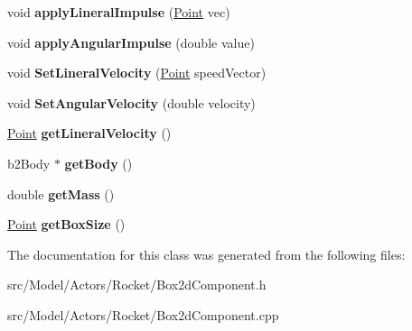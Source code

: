 \begin{DoxyCompactItemize}
\item 
void {\bfseries apply\+Lineral\+Impulse} (\hyperlink{classPoint}{Point} vec)\hypertarget{classBox2dComponent_a222c329dd4b78ba416b37e23046cc729}{}\label{classBox2dComponent_a222c329dd4b78ba416b37e23046cc729}

\item 
void {\bfseries apply\+Angular\+Impulse} (double value)\hypertarget{classBox2dComponent_aa1be5c7330ce571911b2a642aebeff7b}{}\label{classBox2dComponent_aa1be5c7330ce571911b2a642aebeff7b}

\item 
void {\bfseries Set\+Lineral\+Velocity} (\hyperlink{classPoint}{Point} speed\+Vector)\hypertarget{classBox2dComponent_a853f5c32d29169a4ec13c1d92ed9eb02}{}\label{classBox2dComponent_a853f5c32d29169a4ec13c1d92ed9eb02}

\item 
void {\bfseries Set\+Angular\+Velocity} (double velocity)\hypertarget{classBox2dComponent_a7093fe0c26442b394c487c892d601891}{}\label{classBox2dComponent_a7093fe0c26442b394c487c892d601891}

\item 
\hyperlink{classPoint}{Point} {\bfseries get\+Lineral\+Velocity} ()\hypertarget{classBox2dComponent_a6d2848cfe0e699038274c549993def47}{}\label{classBox2dComponent_a6d2848cfe0e699038274c549993def47}

\item 
b2\+Body $\ast$ {\bfseries get\+Body} ()\hypertarget{classBox2dComponent_a73685bf084d8043f3c771b1a21f90b3a}{}\label{classBox2dComponent_a73685bf084d8043f3c771b1a21f90b3a}

\item 
double {\bfseries get\+Mass} ()\hypertarget{classBox2dComponent_a10e6cae953fa1382d9d2adad9509b16e}{}\label{classBox2dComponent_a10e6cae953fa1382d9d2adad9509b16e}

\item 
\hyperlink{classPoint}{Point} {\bfseries get\+Box\+Size} ()\hypertarget{classBox2dComponent_a7e00a4971f000feec4f1824dfd1d171e}{}\label{classBox2dComponent_a7e00a4971f000feec4f1824dfd1d171e}

\end{DoxyCompactItemize}


The documentation for this class was generated from the following files\+:\begin{DoxyCompactItemize}
\item 
src/\+Model/\+Actors/\+Rocket/Box2d\+Component.\+h\item 
src/\+Model/\+Actors/\+Rocket/Box2d\+Component.\+cpp\end{DoxyCompactItemize}
